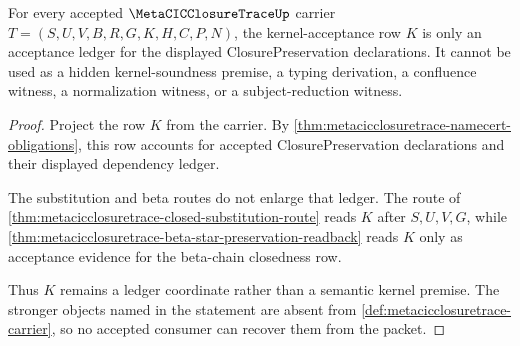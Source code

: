 \begin{theorem}
\label{thm:metacicclosuretrace-kernel-ledger-boundary}
For every accepted $\MetaCICClosureTraceUp$ carrier $T=(S,U,V,B,R,G,K,H,C,P,N)$, the kernel-acceptance row $K$ is only an acceptance ledger for the displayed ClosurePreservation declarations. It cannot be used as a hidden kernel-soundness premise, a typing derivation, a confluence witness, a normalization witness, or a subject-reduction witness.
\end{theorem}
\begin{proof}
Project the row $K$ from the carrier. By \autoref{thm:metacicclosuretrace-namecert-obligations}, this row accounts for accepted ClosurePreservation declarations and their displayed dependency ledger.

The substitution and beta routes do not enlarge that ledger. The route of \autoref{thm:metacicclosuretrace-closed-substitution-route} reads $K$ after $S,U,V,G$, while \autoref{thm:metacicclosuretrace-beta-star-preservation-readback} reads $K$ only as acceptance evidence for the beta-chain closedness row.

Thus $K$ remains a ledger coordinate rather than a semantic kernel premise. The stronger objects named in the statement are absent from \autoref{def:metacicclosuretrace-carrier}, so no accepted consumer can recover them from the packet.
\end{proof}

